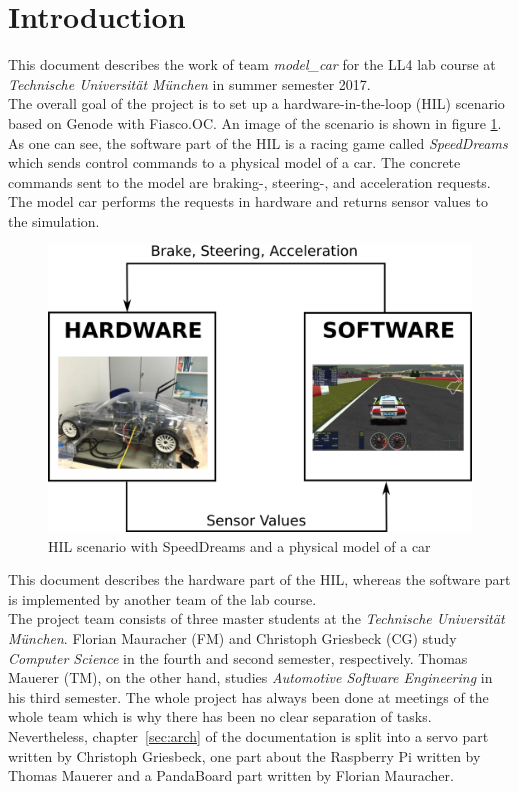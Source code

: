 \section{Introduction}
\label{sec:intro}
This document describes the work of team \textit{model\_car} for the LL4 lab course at \textit{Technische Universität München} in summer semester 2017. \\

The overall goal of the project is to set up a hardware-in-the-loop (HIL) scenario based on Genode with Fiasco.OC. An image of the scenario is shown in figure \ref{fig:hil}. As one can see, the software part of the HIL is a racing game called \textit{SpeedDreams} which sends control commands to a physical model of a car. The concrete commands sent to the model are braking-, steering-, and acceleration requests. The model car performs the requests in hardware and returns sensor values to the simulation. \\

\begin{figure}[h]
    \centering
    \includegraphics[width=0.7\linewidth]{images/hil}
    \caption{HIL scenario with SpeedDreams and a physical model of a car}
    \label{fig:hil}
\end{figure}

This document describes the hardware part of the HIL, whereas the software part is implemented by another team of the lab course. \\

The project team consists of three master students at the \textit{Technische Universität München}. Florian Mauracher (FM) and Christoph Griesbeck (CG) study \textit{Computer Science} in the fourth and second semester, respectively. Thomas Mauerer (TM), on the other hand, studies \textit{Automotive Software Engineering} in his third semester. The whole project has always been done at meetings of the whole team which is why there has been no clear separation of tasks. Nevertheless, chapter~\ref{sec:arch} of the documentation is split into a servo part written by Christoph Griesbeck, one part about the Raspberry Pi written by Thomas Mauerer and a PandaBoard part written by Florian Mauracher.
